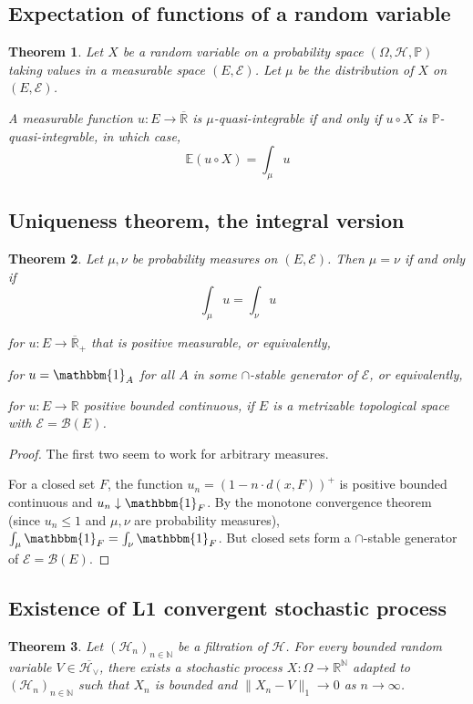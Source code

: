 \documentclass[11pt, a4paper, openany]{book}
\newtheorem{thm}{Theorem}\newtheorem{lem}{Lemma}\newtheorem{crl}{Corollary}
\theoremstyle{definition}
\newcommand{\er}{\overline{\mathbb{R}}}
\newenvironment{tight_enumerate}{\begin{enumerate}\itemsep -0.2em}{\end{enumerate}}
\begin{document}
\subsection{Expectation of functions of a random variable}
    \begin{thm}
        Let $X$ be a random variable on a probability space $(\Omega,\mathscr{H},\mathbb{P})$ taking values in a measurable space $(E,\mathscr{E})$. Let $\mu$ be the distribution of $X$ on $(E,\mathscr{E})$.

        A measurable function $u:E\rightarrow \er$ is $\mu$-quasi-integrable if and only if $u\circ X$ is $\mathbb{P}$-quasi-integrable, in which case,
        \[
            \mathbb{E}(u\circ X)=\int_\mu u
        \]
    \end{thm}
\subsection{Uniqueness theorem, the integral version}
    \begin{thm}
        Let $\mu,\nu$ be probability measures on $(E,\mathscr{E})$. Then $\mu=\nu$ if and only if
        \[
            \int_\mu u=\int_\nu u
        \]
        \begin{tight_enumerate}
            \item for $u:E\rightarrow\er_+$ that is positive measurable, or equivalently,
            \item for $u=\mathbbm{1}_A$ for all $A$ in some $\cap$-stable generator of $\mathscr{E}$, or equivalently,
            \item for $u:E\rightarrow\mathbb{R}$ positive bounded continuous, if $E$ is a metrizable topological space with $\mathscr{E}=\mathscr{B}(E)$.
        \end{tight_enumerate}
    \end{thm}
    \begin{proof}
        The first two seem to work for arbitrary measures.
    
        For a closed set $F$, the function $u_n=(1-n\cdot d(x,F))^+$ is positive bounded continuous and $u_n\downarrow \mathbbm{1}_F$. By the monotone convergence theorem (since $u_n\leqslant 1$ and $\mu,\nu$ are probability measures), $\int_\mu \mathbbm{1}_F=\int_\nu \mathbbm{1}_F$. But closed sets form a $\cap$-stable generator of $\mathscr{E}=\mathscr{B}(E)$.
    \end{proof}
\subsection{Existence of L1 convergent stochastic process}
    \begin{thm}
        Let $(\mathscr{H}_n)_{n\in\mathbb{N}}$ be a filtration of $\mathscr{H}$. For every bounded random variable $V\in \overline{\mathscr{H}_\vee}$, there exists a stochastic process $X:\Omega\rightarrow \mathbb{R}^\mathbb{N}$ adapted to $(\mathscr{H}_n)_{n\in\mathbb{N}}$ such that $X_n$ is bounded and $\|X_n-V\|_1\to 0$ as $n\to\infty$.
    \end{thm}
\end{document}

